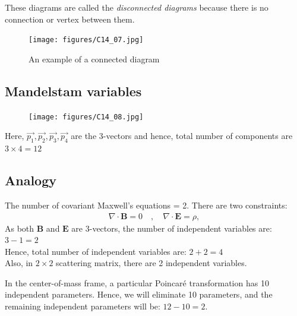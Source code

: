 \documentclass[14pt]{article} %
\begin{document}
These diagrams are called the \textit{disconnected diagrams} because there is no connection or vertex between them.

\begin{figure}[H]
    \centering
    \texttt{[image: figures/C14\_07.jpg]}
    \caption*{An example of a connected diagram}
    \label{fig:placeholder}
\end{figure}

\subsection{Mandelstam variables}
\begin{figure}[H]
    \centering
    \texttt{[image: figures/C14\_08.jpg]}
    \caption*{}
    \label{fig:placeholder}
\end{figure}
\vspace{-0.5cm}
Here, $\vec{p_1}, \vec{p_2}, \vec{p_3}, \vec{p_4}$ are the 3-vectors and hence, total number of components are $3 \times 4 = 12$

\begin{tcolorbox}
\subsection*{Analogy}
The number of covariant Maxwell's equations = 2. There are two constraints:
\begin{align*}
\nabla \cdot \mathbf{B} = 0 \quad, \quad \nabla \cdot \mathbf{E} = \rho,
\end{align*}
As both $\mathbf{B}$ and $\mathbf{E}$ are $3$-vectors, the number of independent variables are: $3 - 1 = 2$ \\

Hence, total number of independent variables are: $2 + 2 = 4$ \\

Also, in $2 \times 2$ scattering matrix, there are 2 independent variables.
\end{tcolorbox}
In the center-of-mass frame, a particular Poincaré transformation has 10 independent parameters. Hence, we will eliminate 10 parameters, and the remaining independent parameters will be: $12 - 10 = 2$. \\
\end{document}
